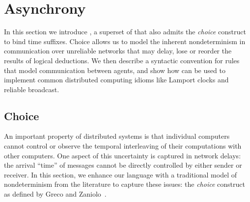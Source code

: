 \section{Asynchrony}
\label{sec:async}

%    

In this section we introduce \lang, a superset of \slang that also admits the
\emph{choice} construct~\cite{greedychoice} to bind time suffixes.  Choice
allows us to model the inherent nondeterminism in communication over unreliable
networks that may delay, lose or reorder the results of logical deductions.  We
then describe a syntactic convention for rules that model communication between
agents, and show how \lang can be used to implement common distributed computing
idioms like Lamport clocks and reliable broadcast.

\subsection{Choice}



An important property of distributed systems is that individual computers cannot control or observe the temporal interleaving of their computations with other computers.  One aspect of this uncertainty is captured in network delays: the arrival ``time'' of messages cannot be directly controlled by either sender or receiver.  In this section, we enhance our language with a traditional model of nondeterminism from the literature to capture these issues: the \emph{choice} construct as defined by Greco and Zaniolo~\cite{greedychoice}.

